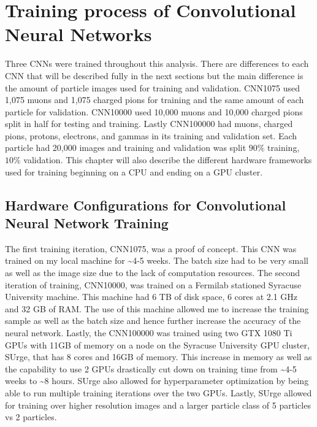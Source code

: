 \chapter{Training process of Convolutional Neural Networks}\label{ch:cnn_train}
Three CNNs were trained throughout this analysis. There are differences to each CNN that will be described fully in the next sections but the main difference is the amount of particle images used for training and validation. CNN1075 used 1,075 muons and 1,075 charged pions for training and the same amount of each particle for validation. CNN10000 used 10,000 muons and 10,000 charged pions split in half for testing and training. Lastly CNN100000 had muons, charged pions, protons, electrons, and gammas in its training and validation set. Each particle had 20,000 images and training and validation was split $90\%$ training, $10\%$ validation. This chapter will also describe the different hardware frameworks used for training beginning on a CPU and ending on a GPU cluster. 




\section{Hardware Configurations for Convolutional Neural Network Training}\label{research approach}
The first training iteration, CNN1075, was a proof of concept. This CNN was trained on my local machine for \sim 4-5 weeks. The batch size had to be very small as well as the image size due to the lack of computation resources. The second iteration of training, CNN10000, was trained on a Fermilab stationed Syracuse University machine. This machine had 6 TB of disk space, 6 cores at 2.1 GHz and 32 GB of RAM. The use of this machine allowed me to increase the training sample as well as the batch size and hence further increase the accuracy of the neural network. Lastly, the CNN100000 was trained using two GTX 1080 Ti GPUs with 11GB of memory on a node on the Syracuse University GPU cluster, SUrge, that has 8 cores and 16GB of memory. This increase in memory as well as the capability to use 2 GPUs drastically cut down on training time from \sim 4-5 weeks to \sim 8 hours. SUrge also allowed for hyperparameter optimization by being able to run multiple training iterations over the two GPUs. Lastly, SUrge allowed for training over higher resolution images and a larger particle class of 5 particles vs 2 particles. 

